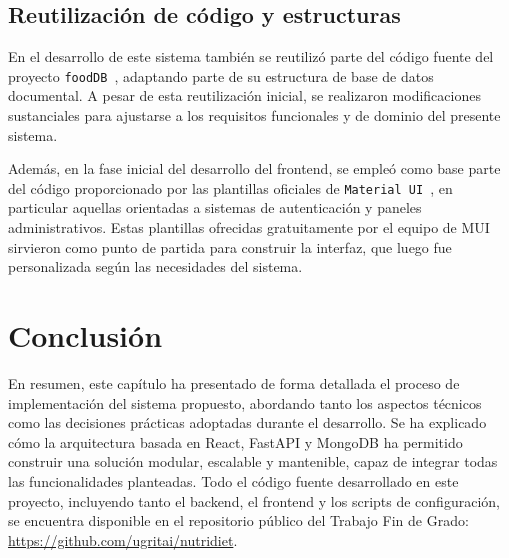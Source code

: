 \subsection*{Reutilización de código y estructuras}

En el desarrollo de este sistema también se reutilizó parte del código fuente del proyecto \texttt{foodDB}~\cite{fooddb}, adaptando parte de su estructura de base de datos documental. A pesar de esta reutilización inicial, se realizaron modificaciones sustanciales para ajustarse a los requisitos funcionales y de dominio del presente sistema.

Además, en la fase inicial del desarrollo del frontend, se empleó como base parte del código proporcionado por las plantillas oficiales de \texttt{Material UI}~\cite{mui_templates}, en particular aquellas orientadas a sistemas de autenticación y paneles administrativos. Estas plantillas ofrecidas gratuitamente por el equipo de MUI sirvieron como punto de partida para construir la interfaz, que luego fue personalizada según las necesidades del sistema.

\section{Conclusión}
En resumen, este capítulo ha presentado de forma detallada el proceso de implementación del sistema propuesto, abordando tanto los aspectos técnicos como las decisiones prácticas adoptadas durante el desarrollo. Se ha explicado cómo la arquitectura basada en React, FastAPI y MongoDB ha permitido construir una solución modular, escalable y mantenible, capaz de integrar todas las funcionalidades planteadas. Todo el código fuente desarrollado en este proyecto, incluyendo tanto el backend, el frontend y los scripts de configuración, se encuentra disponible en el repositorio público del Trabajo Fin de Grado: 
\url{https://github.com/ugritai/nutridiet}.
